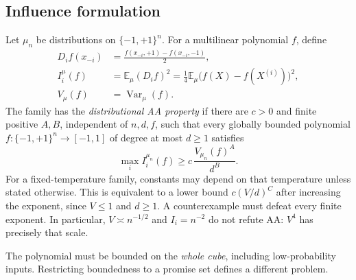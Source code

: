 \subsection{Influence formulation}

Let $\mu_n$ be distributions on $\{-1,+1\}^n$. For a multilinear polynomial $f$, define
\[
\begin{aligned}
 D_if(x_{-i})&=\frac{f(x_{-i},+1)-f(x_{-i},-1)}2,\\
 I_i^\mu(f)&=\mathbb E_\mu(D_if)^2
 =\frac14\mathbb E_\mu\bigl(f(X)-f(X^{(i)})\bigr)^2,\\
 V_\mu(f)&=\operatorname{Var}_\mu(f).
\end{aligned}
\]
The family has the \emph{distributional AA property} if there are $c>0$ and finite positive $A,B$, independent of $n,d,f$, such that every globally bounded polynomial $f:\{-1,+1\}^n\to[-1,1]$ of degree at most $d\ge1$ satisfies
\[
 \max_i I_i^{\mu_n}(f)\ge c\,\frac{V_{\mu_n}(f)^A}{d^B}.
\]
For a fixed-temperature family, constants may depend on that temperature unless stated otherwise. This is equivalent to a lower bound $c(V/d)^C$ after increasing the exponent, since $V\le1$ and $d\ge1$. A counterexample must defeat every finite exponent. In particular, $V\asymp n^{-1/2}$ and $I_i=n^{-2}$ do not refute AA: $V^4$ has precisely that scale.

The polynomial must be bounded on the \emph{whole cube}, including low-probability inputs. Restricting boundedness to a promise set defines a different problem.
